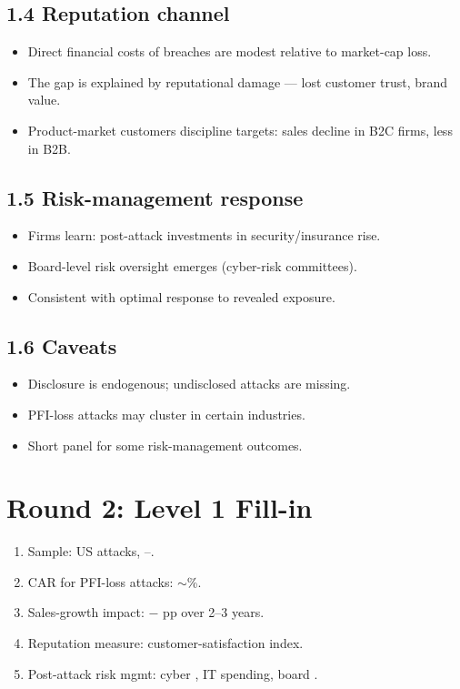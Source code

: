 \documentclass[11pt]{article}
\newcommand{\blank}[1]{\underline{\hspace{#1}}}
\begin{document}
\subsection*{1.4 Reputation channel}
\begin{itemize}
\item Direct financial costs of breaches are modest relative to market-cap loss.
\item The gap is explained by reputational damage --- lost customer trust, brand value.
\item Product-market customers discipline targets: sales decline in B2C firms, less in B2B.
\end{itemize}

\subsection*{1.5 Risk-management response}
\begin{itemize}
\item Firms learn: post-attack investments in security/insurance rise.
\item Board-level risk oversight emerges (cyber-risk committees).
\item Consistent with optimal response to revealed exposure.
\end{itemize}

\subsection*{1.6 Caveats}
\begin{alertbox}
\begin{itemize}
\item Disclosure is endogenous; undisclosed attacks are missing.
\item PFI-loss attacks may cluster in certain industries.
\item Short panel for some risk-management outcomes.
\end{itemize}
\end{alertbox}

\section*{Round 2: Level 1 Fill-in}
\begin{enumerate}
\item Sample: \blank{1cm} US attacks, \blank{1cm}--\blank{1cm}.
\item CAR for PFI-loss attacks: $\sim$\blank{1cm}\%.
\item Sales-growth impact: $-$\blank{1cm} pp over 2--3 years.
\item Reputation measure: \blank{1.5cm} customer-satisfaction index.
\item Post-attack risk mgmt: cyber \blank{1.5cm}, IT spending, board \blank{1.5cm}.
\end{enumerate}
\end{document}
